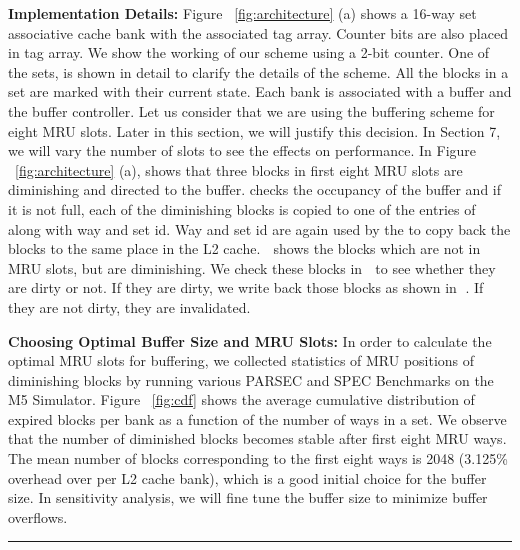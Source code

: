 \noindent\textbf{Implementation Details:}
Figure ~\ref{fig:architecture} (a) shows a 16-way set associative cache bank with the associated tag array.
Counter bits are also placed in tag array. We show the working of
our scheme using a 2-bit counter.  One of the sets, is shown in detail to clarify the details of the scheme.
All the blocks in a set are marked with their current state. Each bank is  associated with a buffer and the buffer controller.
Let us consider that we are using the buffering scheme for eight MRU slots. Later in
this section, we will justify this decision. In Section 7, we will vary the number of slots to see the effects on performance.
In Figure  ~\ref{fig:architecture} (a),  shows that three blocks in first eight MRU slots are diminishing and directed to the buffer.  checks
the occupancy of the buffer and if it is not full, each of the diminishing blocks is copied to one of the entries
of  along with way and set id. Way and set id are again used by the   to copy back the blocks to
the same place in the L2 cache. \textcircled{\raisebox{-.9pt}{A}} shows the blocks which are not in MRU slots,
but are diminishing. We check these blocks in \textcircled{\raisebox{-.9pt}{B}} to see whether they are dirty or not.
If they are dirty, we write back those blocks as shown in \textcircled{\raisebox{-.9pt}{C}}.  If they are not dirty, they are invalidated.

\noindent\textbf{Choosing Optimal Buffer  Size and MRU Slots:}
In order to calculate the optimal MRU slots for buffering, we collected statistics of MRU positions of diminishing blocks
by running various PARSEC and SPEC Benchmarks on the M5 Simulator.
Figure ~\ref{fig:cdf} shows the average cumulative distribution of expired blocks per bank
as a function of the number of ways in a set. We observe that the number of diminished blocks becomes stable
after first eight MRU ways. The mean number of blocks corresponding to the first eight ways is 2048
(3.125\% overhead over per L2 cache bank),
which is a good initial choice for the buffer size. In sensitivity analysis, we will fine tune the buffer size
to minimize buffer overflows.


\begin{figure*} [t]
\centering
 \hrule
 \caption{\label{fig:cdf} \scriptsize \bf Cumulative Distribution of Dead Blocks per Bank with number of ways.}
\end{figure*}


